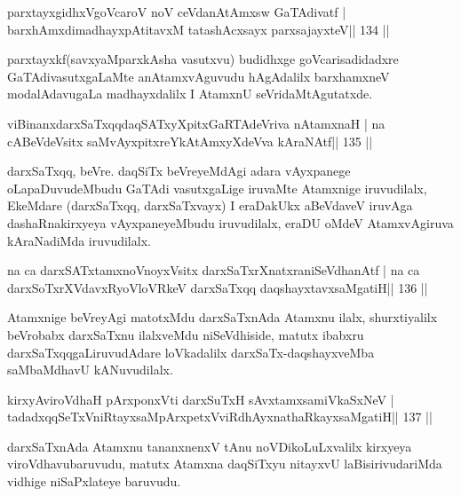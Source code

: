 \begin{shl}
parxtayxgidhxVgoVcaroV noV ceVdanAtAmx\s sw GaTAdivatf |
barxhAmxdimadhayxpAtitavxM tatashAcxsayx parxsajayxteV\hfill || 134 ||
\end{shl}

\begin{artha}
parxtayxkf(savxyaMparxkAsha vasutxvu) budidhxge goVcarisadidadxre GaTAdivasutxgaLaMte anAtamxvAguvudu hAgAdalilx barxhamxneV modalAdavugaLa madhayxdalilx I AtamxnU seVridaMtAgutatxde.
\end{artha}

\begin{shl}
viBinanxdarxSaTxqqdaqSATxyXpitxGaRTAdeVriva nA\s\s tamxnaH |
na cABeVdeV\s sitx saMvAyxpitxreYkAtAmxyXdeVva kAraNAtf\hfill || 135 ||
\end{shl}

\begin{artha}
darxSaTxqq, beVre. daqSiTx beVreyeMdAgi adara vAyxpanege oLapaDuvudeMbudu GaTAdi vasutxgaLige iruvaMte Atamxnige iruvudilalx, EkeMdare (darxSaTxqq, darxSaTxvayx) I eraDakUkx aBeVdaveV iruvAga dashaRnakirxyeya vAyxpaneyeMbudu iruvudilalx, eraDU oMdeV AtamxvAgiruva kAraNadiMda iruvudilalx.
\end{artha}

\begin{shl}
na ca darxSATx\s\s tamxnoV\s noyxV\s sitx darxSaTxrXnatxraniSeVdhanAtf |
na ca darxSoTxrXVdavxRyoVloVRkeV darxSaTxqq daqshayxtavxsaMgatiH\hfill || 136 ||
\end{shl}

\begin{artha}
Atamxnige beVreyAgi matotxMdu darxSaTxnAda Atamxnu ilalx, shurxtiyalilx beVrobabx darxSaTxnu ilalxveMdu niSeVdhiside, matutx ibabxru darxSaTxqqgaLiruvudAdare loVkadalilx darxSaTx-daqshayxveMba saMbaMdhavU kANuvudilalx.
\end{artha}


\begin{shl}
kirxyAviroVdhaH pArxponxVti darxSuTxH sAvxtamxsamiVkaSxNeV |
tadadxqqSeTxVniRtayxsaMpArxpetxVviRdhAyxnathaRkayxsaMgatiH\hfill || 137 ||
\end{shl}

\begin{artha}
darxSaTxnAda Atamxnu tananxnenxV tAnu noVDikoLuLxvalilx kirxyeya viroVdhavu\footnotemark[5] baruvudu, matutx Atamxna daqSiTxyu nitayxvU laBisirivudariMda vidhige niSaPxlateye baruvudu.
\end{artha}

